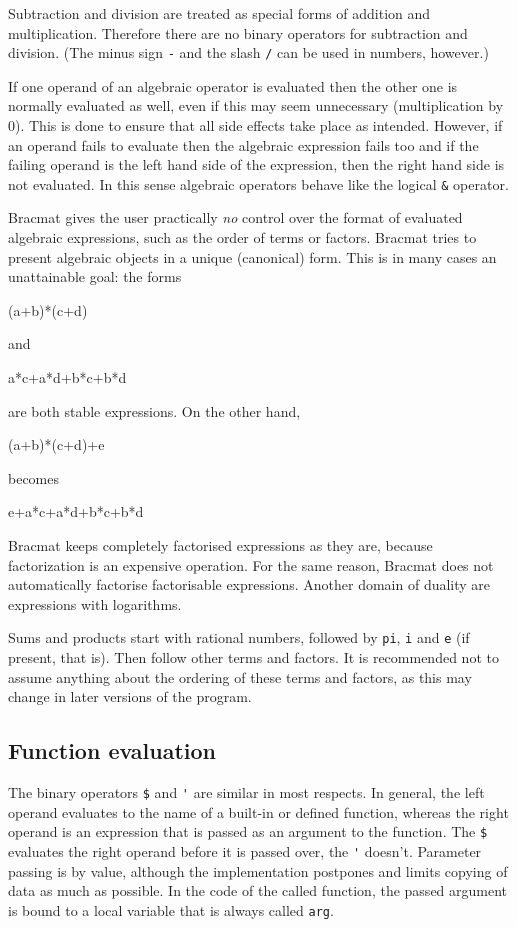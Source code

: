 \documentclass[12pt]{article}
\begin{document}
Subtraction and division are treated as special forms of addition and
multiplication. Therefore there are no binary operators for
subtraction and division. (The minus sign \verb|-| and the slash
\verb|/| can be used in numbers, however.)

If one operand of an algebraic operator is evaluated then the other
one is normally evaluated as well, even if this may seem unnecessary
(multiplication by 0). This is done to ensure that all side effects
take place as intended. However, if an operand fails to evaluate then
the algebraic expression fails too and if the failing operand is the
left hand side of the expression, then the right hand side is not
evaluated. In this sense algebraic operators behave like the logical
\verb|&| operator.

Bracmat gives the user practically \emph{no} control over the format
of evaluated algebraic expressions, such as the order of terms or
factors. Bracmat tries to present algebraic objects in a unique
(canonical) form. This is in many cases an unattainable goal: the
forms
\begin{v}
(a+b)*(c+d)
\end{v}
and
\begin{v}
a*c+a*d+b*c+b*d
\end{v}
are both stable expressions. On the other hand,
\begin{v}
(a+b)*(c+d)+e
\end{v}
becomes
\begin{v}
e+a*c+a*d+b*c+b*d
\end{v}

Bracmat keeps completely factorised expressions as they are, because
factorization is an expensive operation. For the same reason, Bracmat
does not automatically factorise factorisable expressions. Another
domain of duality are expressions with logarithms.

Sums and products start with rational numbers, followed by \verb|pi|,
\verb|i| and \verb|e| (if present, that is). Then follow other terms and
factors. It is recommended not to assume anything about the ordering
of these terms and factors, as this may change in later versions of
the program.

\subsection{Function evaluation}

The binary operators
\verb|$| and \verb|'| are similar in most respects. In general, the
left operand evaluates to the name of a built-in or defined function,
whereas the right operand is an expression that is passed as an
argument to the function. The \verb|$| evaluates the right operand
before it is passed over, the \verb|'| doesn't. Parameter passing is
by value, although the implementation postpones and limits copying of
data as much as possible. In the code of the called function, the
passed argument is bound to a local variable that is always called
\verb|arg|.
\end{document}
